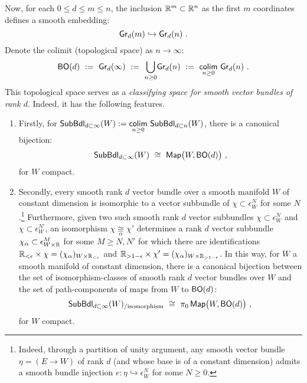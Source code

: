 Now, for each $0\leq d\leq m \leq n$, the inclusion $\mathbb R^m \subset \mathbb R^n$ as the first $m$ coordinates defines a smooth embedding:
\[
{\sf Gr}_d(m)
\hookrightarrow
{\sf Gr}_d(n)
~.
\]
Denote the colimit (topological space) as $n\to \infty$:
\[
{\sf BO}(d)
~:=~
{\sf Gr}_d(\infty)
~:=~
\underset{n\geq 0}
\bigcup
{\sf Gr}_d(n)
~:=~
\underset{n \geq 0}
{\operatorname{{\sf colim}}}
~{\sf Gr}_d(n)
~.
\]
This topological space serves as a \emph{classifying space for smooth vector bundles of rank $d$}.
Indeed, it has the following features.
\begin{enumerate}

\item
Firstly, for ${\sf SubBdl}_{d \subset \infty}(W) := \underset{n\geq 0} {\operatorname{{\sf colim}}} ~{\sf SubBdl}_{d \subset n}(W)$, 
there is a canonical bijection:
\[
{\sf SubBdl}_{d \subset \infty}(W)
~\cong~
\operatorname{{\sf Map}}\bigl(
W , {\sf BO}(d) \bigr)
~,
\]
for $W$ compact.


\item
Secondly, every smooth rank $d$ vector bundle over a smooth manifold $W$ of constant dimension is isomorphic to a vector subbundle of $\chi \subset \epsilon^N_W$ for some $N$.\footnote{Indeed, through a partition of unity argument, any smooth vector bundle $\eta = (E\to W)$ of rank $d$ (and whose base is of a constant dimension) admits a smooth bundle injection $e\colon \eta \hookrightarrow \epsilon^N_W$ for some $N \geq 0$.}
Furthermore, given two such smooth rank $d$ vector subbundles $\chi \subset \epsilon^N_W$ and $\chi \subset \epsilon^{N'}_W$, an isomorphism $\chi \underset{\alpha}\cong \chi'$ determines a rank $d$ vector subbundle $\chi_\alpha \subset \epsilon^M_{W\times \mathbb R}$ for some $M \geq N,N'$ for which there are identifications $\mathbb R_{<\epsilon}\times \chi = (\chi_\alpha)_{W\times \mathbb R_{<\epsilon}}$ and $\mathbb R_{> 1-\epsilon}\times \chi' = (\chi_\alpha)_{W\times \mathbb R_{>1-\epsilon}}$.  
In this way, for $W$ a smooth manifold of constant dimension,
there is a canonical bijection between the set of isomorphism-classes of smooth rank $d$ vector bundles over $W$ and the set of path-components of maps from $W$ to ${\sf BO}(d)$:
\begin{equation}
\label{e11m}
{\sf SubBdl}_{d \subset \infty}(W)_{/\rm isomorphism}
~\cong~
\pi_0 \operatorname{{\sf Map}}\bigl( W , {\sf BO}(d) \bigr)
~,
\end{equation}
for $W$ compact.




\end{enumerate}
